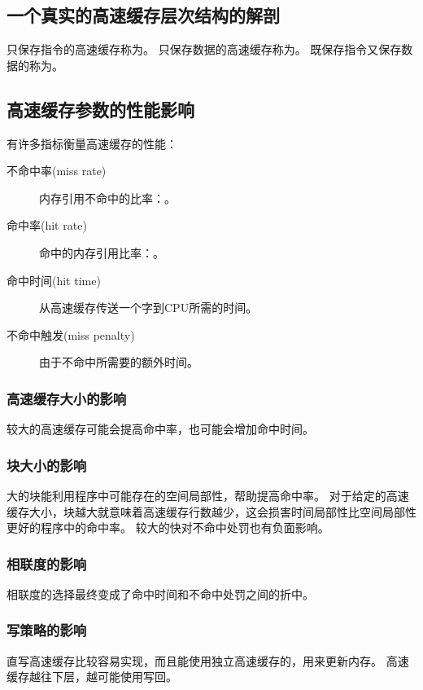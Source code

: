 {    \subsection{一个真实的高速缓存层次结构的解剖}
    {
        只保存指令的高速缓存称为。
        只保存数据的高速缓存称为。
        既保存指令又保存数据的称为。
    }

    \subsection{高速缓存参数的性能影响}
    {
        有许多指标衡量高速缓存的性能：

        \begin{description}
            \item[不命中率(miss rate)] 内存引用不命中的比率：。
            \item[命中率(hit rate)] 命中的内存引用比率：。
            \item[命中时间(hit time)] 从高速缓存传送一个字到CPU所需的时间。
            \item[不命中触发(miss penalty)] 由于不命中所需要的额外时间。
        \end{description}

        \subsubsection{高速缓存大小的影响}
        {
            较大的高速缓存可能会提高命中率，也可能会增加命中时间。
        }

        \subsubsection{块大小的影响}
        {
            大的块能利用程序中可能存在的空间局部性，帮助提高命中率。
            对于给定的高速缓存大小，块越大就意味着高速缓存行数越少，这会损害时间局部性比空间局部性更好的程序中的命中率。
            较大的快对不命中处罚也有负面影响。
        }

        \subsubsection{相联度的影响}
        {
            相联度的选择最终变成了命中时间和不命中处罚之间的折中。
        }

        \subsubsection{写策略的影响}
        {
            直写高速缓存比较容易实现，而且能使用独立高速缓存的，用来更新内存。
            高速缓存越往下层，越可能使用写回。
        }
    }
}
